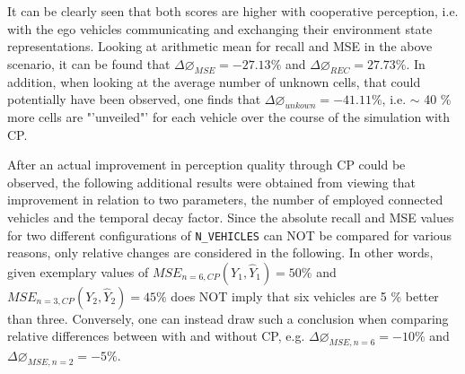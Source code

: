 It can be clearly seen that both scores are higher with cooperative perception, i.e. with the ego vehicles communicating and exchanging their environment state representations. Looking at arithmetic mean for recall and MSE in the above scenario, it can be found that $\Delta \diameter_{MSE} = -27.13 \%$ and $\Delta \diameter_{REC} = 27.73 \%$. In addition, when looking at the average number of unknown cells, that could potentially have been observed, one finds that $\Delta \diameter_{unkown} = -41.11 \%$, i.e. $\sim$ 40 \% more cells are "'unveiled"' for each vehicle over the course of the simulation with CP.
\par
\bigskip

After an actual improvement in perception quality through CP could be observed, the following additional results were obtained from viewing that improvement in relation to two parameters, the number of employed connected vehicles and the temporal decay factor. Since the absolute recall and MSE values for two different configurations of \texttt{N\_VEHICLES} can NOT be compared for various reasons, only relative changes are considered in the following. In other words, given exemplary values of $\textit{MSE}_{n=6, CP}(Y_1, \hat{Y}_1) = 50 \%$ and $\textit{MSE}_{n=3, CP}(Y_2, \hat{Y}_2) = 45 \%$ does NOT imply that six vehicles are 5 \% better than three. Conversely, one can instead draw such a conclusion when comparing relative differences between with and without CP, e.g. $\Delta \diameter_{MSE,n=6} = -10 \%$ and $\Delta \diameter_{MSE,n=2} = -5 \%$.

